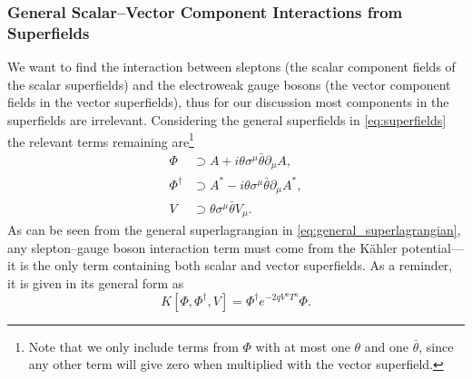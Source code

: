 \subsubsection{General Scalar--Vector Component Interactions from Superfields}
We want to find the interaction between sleptons (the scalar component fields of the scalar superfields) and the electroweak gauge bosons (the vector component fields in the vector superfields), thus for our discussion most components in the superfields are irrelevant.
Considering the general superfields in \cref{eq:superfields} the relevant terms remaining are\footnote{
    Note that we only include terms from $\Phi$ with at most one $\theta$ and one $\bar\theta$, since any other term will give zero when multiplied with the vector superfield.
}
\begin{align*}
    \Phi &\supset A + i\theta\sigma^\mu\bar\theta \partial_\mu A,
    \\
    \Phi^\dagger &\supset A^* - i\theta\sigma^\mu\bar\theta \partial_\mu A^*,
    \\
    V &\supset \theta\sigma^\mu\bar\theta V_\mu.
\end{align*}
As can be seen from the general superlagrangian in \cref{eq:general_superlagrangian}, any slepton--gauge boson interaction term must come from the K\"ahler potential---it is the only term containing both scalar and vector superfields. As a reminder, it is given in its general form as
\begin{equation}\label{eq:kahler}
    K[\Phi,\Phi^\dagger,V] = \Phi^\dagger e^{-2qV^aT^a} \Phi.
\end{equation}

